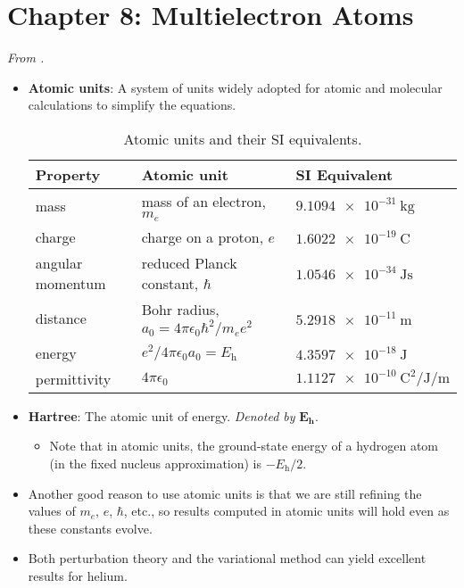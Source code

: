 \documentclass[../notes.tex]{subfiles}
\begin{document}
\section{Chapter 8: Multielectron Atoms}
\emph{From \textcite{bib:McQuarrieSimon}.}
\begin{itemize}
    \item {}\textbf{Atomic units}: A system of units widely adopted for atomic and molecular calculations to simplify the equations.
    \begin{table}[H]
        \centering
        \small
        \renewcommand{\arraystretch}{1.4}
        \begin{tabular}{lll}
            \toprule
            Property & Atomic unit & SI Equivalent\\
            \midrule
            mass & mass of an electron, $m_e$ & $\SI{9.1094e-31}{\kilo\gram}$\\
            charge & charge on a proton, $e$ & $\SI{1.6022e-19}{\coulomb}$\\
            angular momentum & reduced Planck constant, $\hbar$ & $\SI{1.0546e-34}{\joule\second}$\\
            distance & Bohr radius, $a_0=4\pi\epsilon_0\hbar^2/m_ee^2$ & $\SI{5.2918e-11}{\meter}$\\
            energy & $e^2/4\pi\epsilon_0a_0=E_\text{h}$ & $\SI{4.3597e-18}{\joule}$\\
            permittivity & $4\pi\epsilon_0$ & $\SI{1.1127e-10}{\square\coulomb\per\joule\per\meter}$\\
            \bottomrule
        \end{tabular}
        \caption{Atomic units and their SI equivalents.}
        \label{tab:atomicUnits}
    \end{table}
    \item \textbf{Hartree}: The atomic unit of energy. \emph{Denoted by} $\bm{E}_\textbf{h}$.
    \begin{itemize}
        \item Note that in atomic units, the ground-state energy of a hydrogen atom (in the fixed nucleus approximation) is $-E_\text{h}/2$.
    \end{itemize}
    \item Another good reason to use atomic units is that we are still refining the values of $m_e$, $e$, $\hbar$, etc., so results computed in atomic units will hold even as these constants evolve.
    \item Both perturbation theory and the variational method can yield excellent results for helium.

\end{itemize}
\end{document}
